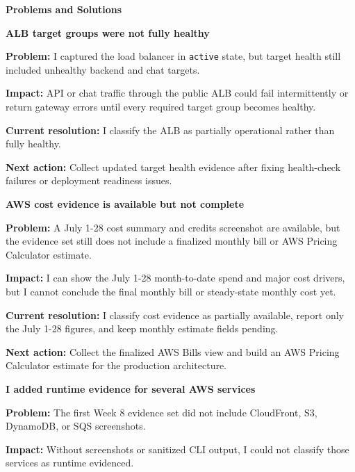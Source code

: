 \vspace{0.5em}\noindent\textbf{Problems and Solutions}\par

\vspace{0.5em}\noindent\textbf{ALB target groups were not fully
healthy}\par

\textbf{Problem:} I captured the load balancer in \texttt{active} state,
but target health still included unhealthy backend and chat targets.

\textbf{Impact:} API or chat traffic through the public ALB could fail
intermittently or return gateway errors until every required target
group becomes healthy.

\textbf{Current resolution:} I classify the ALB as partially operational
rather than fully healthy.

\textbf{Next action:} Collect updated target health evidence after
fixing health-check failures or deployment readiness issues.

\vspace{0.5em}\noindent\textbf{AWS cost evidence is available but not
complete}\par

\textbf{Problem:} A July 1-28 cost summary and credits screenshot are
available, but the evidence set still does not include a finalized
monthly bill or AWS Pricing Calculator estimate.

\textbf{Impact:} I can show the July 1-28 month-to-date spend and major
cost drivers, but I cannot conclude the final monthly bill or
steady-state monthly cost yet.

\textbf{Current resolution:} I classify cost evidence as partially
available, report only the July 1-28 figures, and keep monthly estimate
fields pending.

\textbf{Next action:} Collect the finalized AWS Bills view and build an
AWS Pricing Calculator estimate for the production architecture.

\vspace{0.5em}\noindent\textbf{I added runtime evidence for several AWS
services}\par

\textbf{Problem:} The first Week 8 evidence set did not include
CloudFront, S3, DynamoDB, or SQS screenshots.

\textbf{Impact:} Without screenshots or sanitized CLI output, I could
not classify those services as runtime evidenced.

